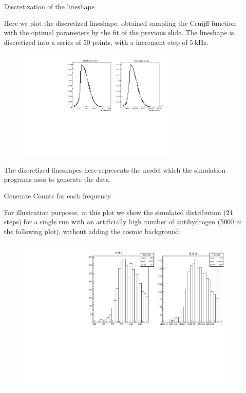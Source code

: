\documentclass[8pt]{beamer}
\newcommand{\nologo}{\setbeamertemplate{logo}{}}
\begin{document}
{\nologo
\begin{frame}{Discretization of the lineshape}

Here we plot the discretized lineshape, obtained sampling the Cruijff function with the optimal parameters by the fit of the previous slide. The lineshape is discretized into a series of 50 points, with a increment step of $\SI{5}{\kilo \hertz}$.

\begin{figure}[hbtp]
\centering
\includegraphics[width = 0.7\textwidth]{../LineShape/Plot/CruijffLineShapes.pdf}
\end{figure}

The discretized lineshapes here represents the model which the simulation programs uses to generate the data. 
\end{frame}

\begin{frame}{Generate Counts for each frequency}

For illustration purposes, in this plot we show the simulated distribution (24 steps) for a single run with an artificially high number of antihydrogen (5000 in the following plot), without adding the cosmic background:

\begin{figure}[hbtp]
\centering
\includegraphics[width = \textwidth]{../LineShape/Plot/LineshapeSampled.pdf}
\end{figure}
\end{frame}
}
\end{document}
